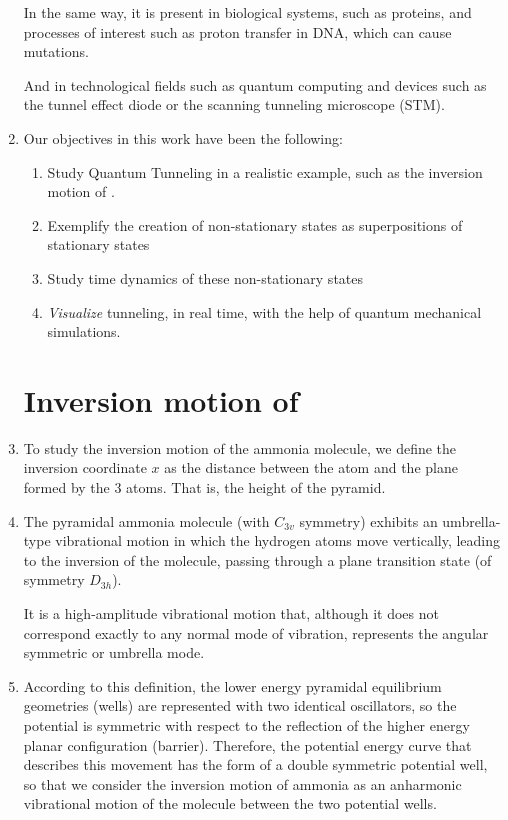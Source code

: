 \documentclass[12pt, a4paper]{article}
\begin{document}
\begin{enumerate}[label=\textbf{Slide \arabic*.}]
         In the same way, it is present in biological systems, such as proteins, and processes of interest such as proton transfer in DNA, which can cause mutations.

         And in technological fields such as quantum computing and devices such as the tunnel effect diode or the scanning tunneling microscope (STM).

    \item Our objectives in this work have been the following:
        \begin{enumerate}[label=\arabic*.]
            \item Study Quantum Tunneling in a realistic example, such as the inversion motion of .
            \item Exemplify the creation of non-stationary states as superpositions of stationary states
            \item Study time dynamics of these non-stationary states
            \item \textit{Visualize} tunneling, in real time, with the help of quantum mechanical simulations.
        \end{enumerate}

    \section{Inversion motion of }

    \item To study the inversion motion of the ammonia molecule, we define the inversion coordinate $x$ as the distance between the  atom and the plane formed by the 3  atoms. That is, the height of the pyramid.

    \item The pyramidal ammonia molecule (with $C_{3v}$ symmetry) exhibits an umbrella-type vibrational motion in which the hydrogen atoms move vertically, leading to the inversion of the molecule, passing through a plane transition state (of symmetry $D_{3h}$).

        It is a high-amplitude vibrational motion that, although it does not correspond exactly to any normal mode of vibration, represents the angular symmetric or umbrella mode.

    \item According to this definition, the lower energy pyramidal equilibrium geometries (wells) are represented with two identical oscillators, so the potential is symmetric with respect to the reflection of the higher energy planar configuration (barrier). Therefore, the potential energy curve that describes this movement has the form of a double symmetric potential well, so that we consider the inversion motion of ammonia as an anharmonic vibrational motion of the  molecule between the two potential wells.


\end{enumerate}
\end{document}
